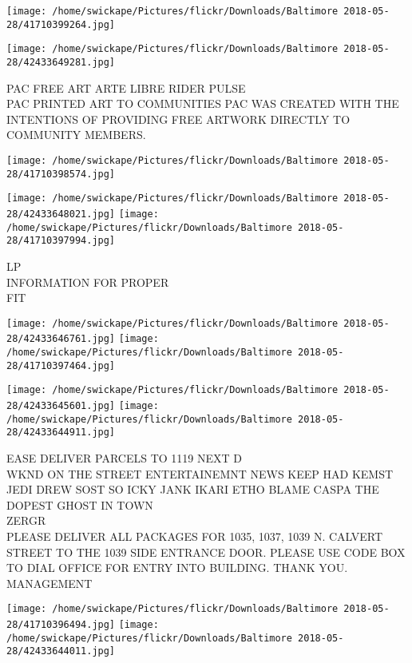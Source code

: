 \documentclass[10pt,letterpaper]{article}
\begin{document}
\texttt{[image: /home/swickape/Pictures/flickr/Downloads/Baltimore 2018-05-28/41710399264.jpg]}

\vspace{0.25in}
\texttt{[image: /home/swickape/Pictures/flickr/Downloads/Baltimore 2018-05-28/42433649281.jpg]}

PAC FREE ART ARTE LIBRE RIDER PULSE\\
PAC PRINTED ART TO COMMUNITIES PAC WAS CREATED WITH THE INTENTIONS OF PROVIDING FREE ARTWORK DIRECTLY TO COMMUNITY MEMBERS.\\
\pagebreak

\texttt{[image: /home/swickape/Pictures/flickr/Downloads/Baltimore 2018-05-28/41710398574.jpg]}

\vspace{0.25in}
\texttt{[image: /home/swickape/Pictures/flickr/Downloads/Baltimore 2018-05-28/42433648021.jpg]}
\texttt{[image: /home/swickape/Pictures/flickr/Downloads/Baltimore 2018-05-28/41710397994.jpg]}

LP\\
INFORMATION FOR PROPER\\
FIT\\
\pagebreak

\texttt{[image: /home/swickape/Pictures/flickr/Downloads/Baltimore 2018-05-28/42433646761.jpg]}
\texttt{[image: /home/swickape/Pictures/flickr/Downloads/Baltimore 2018-05-28/41710397464.jpg]}

\texttt{[image: /home/swickape/Pictures/flickr/Downloads/Baltimore 2018-05-28/42433645601.jpg]}
\texttt{[image: /home/swickape/Pictures/flickr/Downloads/Baltimore 2018-05-28/42433644911.jpg]}

EASE DELIVER PARCELS TO 1119 NEXT D\\
WKND ON THE STREET ENTERTAINEMNT NEWS KEEP HAD KEMST JEDI DREW SOST SO ICKY JANK IKARI ETHO BLAME CASPA THE DOPEST GHOST IN TOWN\\
ZERGR\\
PLEASE DELIVER ALL PACKAGES FOR 1035, 1037, 1039 N. CALVERT STREET TO THE 1039 SIDE ENTRANCE DOOR.  PLEASE USE CODE BOX TO DIAL OFFICE FOR ENTRY INTO BUILDING.  THANK YOU.  MANAGEMENT\\
\pagebreak

\texttt{[image: /home/swickape/Pictures/flickr/Downloads/Baltimore 2018-05-28/41710396494.jpg]}
\texttt{[image: /home/swickape/Pictures/flickr/Downloads/Baltimore 2018-05-28/42433644011.jpg]}
\end{document}
